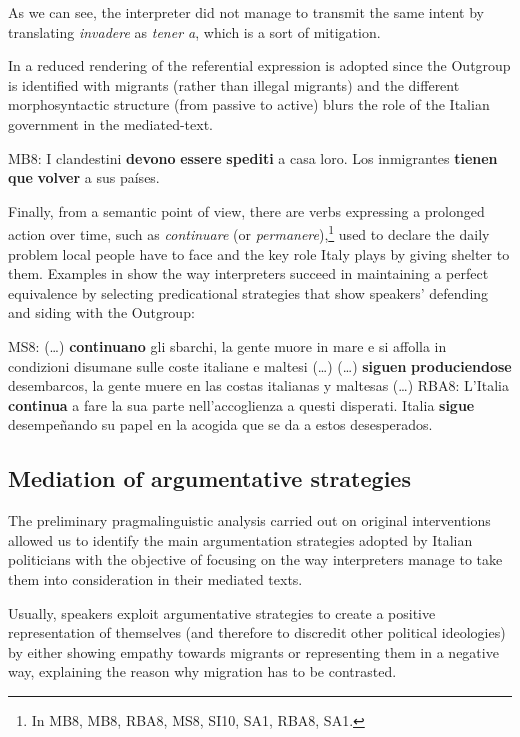 \documentclass[output=paper]{langscibook}
\begin{document}
As we can see, the interpreter did not manage to transmit the same intent by translating \textit{invadere} as \textit{tener a}, which is a sort of mitigation. 

In  a reduced rendering of the referential expression is adopted since the Outgroup is identified with migrants (rather than illegal migrants) and the different morphosyntactic structure (from passive to active) blurs the role of the Italian government in the mediated-text.

\ea\label{ex:mori:16}
\ea
MB8: I clandestini \textbf{devono} \textbf{essere} \textbf{spediti} a casa loro. 
\ex
Los inmigrantes \textbf{tienen} \textbf{que} \textbf{volver} a sus países.
\z
\z

Finally, from a semantic point of view, there are verbs expressing a prolonged action over time, such as \textit{continuare} (or \textit{permanere}),\footnote{In MB8, MB8, RBA8, MS8, SI10, SA1, RBA8, SA1.} used to declare the daily problem local people have to face and the key role Italy plays by giving shelter to them. Examples in  show the way interpreters succeed in maintaining a perfect equivalence by selecting predicational strategies that show speakers’ defending and siding with the Outgroup:

\ea\label{ex:mori:17}
\ea
 MS8: (\ldots) \textbf{continuano} gli sbarchi, la gente muore in mare e si affolla in condizioni disumane sulle coste italiane e maltesi (…)
\ex
(\ldots) \textbf{siguen} \textbf{produciendose} desembarcos, la gente muere en las costas italianas y maltesas (…)
\ex
RBA8: L'Italia \textbf{continua} a fare la sua parte nell'accoglienza a questi disperati.
\ex
Italia \textbf{sigue} desempeñando su papel en la acogida que se da a estos desesperados. 
\z
\z


\subsection{Mediation of argumentative strategies}\label{sec:mori:4.3}

The preliminary pragmalinguistic analysis carried out on original interventions allowed us to identify the main argumentation strategies adopted by Italian politicians with the objective of focusing on the way interpreters manage to take them into consideration in their mediated texts.

Usually, speakers exploit argumentative strategies to create a positive representation of themselves (and therefore to discredit other political ideologies) by either showing empathy towards migrants or representing them in a negative way, explaining the reason why migration has to be contrasted.
\end{document}
